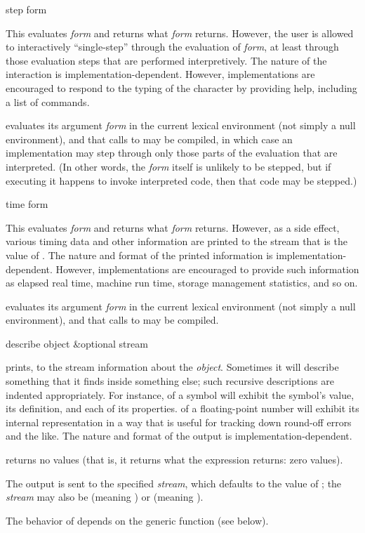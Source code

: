 \begin{defmac}
step form

This evaluates \emph{form} and returns what \emph{form} returns.
However, the user is allowed to interactively
``single-step'' through the evaluation of \emph{form}, at least
through those evaluation steps that are performed interpretively.
The nature of the interaction is implementation-dependent.
However, implementations are encouraged to respond to the typing
of the character  by providing help, including a list
of commands.

 evaluates its argument \emph{form}
in the current lexical environment (not simply a null environment),
and that calls to  may be compiled, in which case
an implementation may step through only those parts of the
evaluation that are interpreted.  (In other words, the \emph{form}
itself is unlikely to be stepped, but if executing it happens to
invoke interpreted code, then that code may be stepped.)
\end{defmac}

\begin{defmac}
time form

This evaluates \emph{form} and returns what \emph{form} returns.  However, as
a side effect, various timing data and other information are printed to
the stream that is the value of .  The nature and
format of the printed information is implementation-dependent.  However,
implementations are encouraged to provide such information as elapsed
real time, machine run time, storage management statistics, and so on.

 evaluates its argument \emph{form}
in the current lexical environment (not simply a null environment),
and that calls to  may be compiled.
\end{defmac}

\begin{defun}[Function]
describe object &optional stream

 prints, to the stream information about the \emph{object}.
Sometimes it will describe something that it finds inside something else;
such recursive descriptions are indented appropriately.  For instance,
 of a symbol will exhibit the symbol's value,
its definition, and each of its properties.   of a
floating-point number will exhibit its internal representation in a way
that is useful for tracking down round-off errors and the like.
The nature and format of the output is implementation-dependent.

 returns no values (that is, it returns what the expression
 returns: zero values).

The output is sent to the specified \emph{stream}, which
 defaults to the value of ;
 the \emph{stream} may also be  (meaning )
 or  (meaning ).

The behavior of  depends on the generic function
 (see below).
\end{defun}

